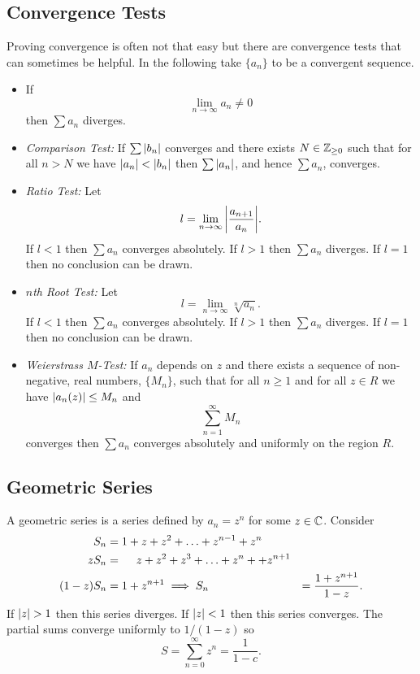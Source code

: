 \documentclass{article}
\begin{document}
    \subsection{Convergence Tests}
    Proving convergence is often not that easy but there are convergence tests that can sometimes be helpful.
    In the following take \(\{a_n\}\) to be a convergent sequence.
    \begin{itemize}
        \item If
        \[\lim_{n\to\infty} a_n \ne 0\]
        then \(\sum a_n\) diverges.
        \item \emph{Comparison Test:} If \(\sum \abs{b_n}\) converges and there exists \(N\in\mathbb{Z}_{\ge0}\) such that for all \(n > N\) we have \(\abs{a_n} < \abs{b_n}\) then \(\sum \abs{a_n}\), and hence \(\sum a_n\), converges.
        \item \emph{Ratio Test:} Let
        \[l = \lim_{n\to\infty} \abs{\frac{a_{n+1}}{a_n}}.\]
        If \(l < 1\) then \(\sum a_n\) converges absolutely.
        If \(l > 1\) then \(\sum a_n\) diverges.
        If \(l = 1\) then no conclusion can be drawn.
        \item \emph{\(n\)th Root Test:} Let
        \[l = \lim_{n\to\infty} \sqrt[n]{a_n}.\]
        If \(l < 1\) then \(\sum a_n\) converges absolutely.
        If \(l > 1\) then \(\sum a_n\) diverges.
        If \(l = 1\) then no conclusion can be drawn.
        \item \emph{Weierstrass \(M\)-Test:} If \(a_n\) depends on \(z\) and there exists a sequence of non-negative, real numbers, \(\{M_n\}\), such that for all \(n \ge 1\) and for all \(z\in R\) we have \(\abs{a_n(z)} \le M_n\) and
        \[\sum_{n=1}^{\infty} M_n\]
        converges then
        \(\sum a_n\) converges absolutely and uniformly on the region \(R\).
    \end{itemize}
    
    \subsection{Geometric Series}
    A geometric series is a series defined by \(a_n = z^n\) for some \(z\in\mathbb{C}\).
    Consider
    \begin{align*}
        S_n &= 1 + z + z^2 + \dotsc + z^{n-1} + z^n\\
        zS_n &= \hphantom{1 +} z + z^2 + z^3 + \dotsc + z^n + + z^{n+1}\\
        (1 - z)S_n &= 1 + z^{n+1}
        \implies S_n &= \frac{1 + z^{n+1}}{1 - z}.
    \end{align*}
    If \(\abs{z} > 1\) then this series diverges.
    If \(\abs{z} < 1\) then this series converges.
    The partial sums converge uniformly to \(1 / (1 - z)\) so
    \[S = \sum_{n=0}^{\infty} z^n = \frac{1}{1 - c}.\]
    
\end{document}
